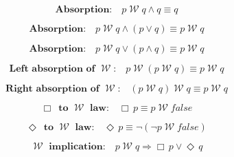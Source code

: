 \documentclass[12pt, fleqn, leqno]{article}
\newcommand{\impl}{\ensuremath{\Rightarrow}}        %
\newcommand{\Wait}{\;\mathcal{W}\;}
\newcommand{\Event}{\Diamond\,}
\newcommand{\Always}{\Box\,}
\newcommand{\spacer}{\vspace{-30pt}}
\begin{document}
\spacer

\begin{equation}\label{E:waitAndQ}
\textbf{Absorption:}\quad p\Wait q\land q\equiv q
\end{equation}

\spacer

\begin{equation}\label{E:waitAndOr}
\textbf{Absorption:}\quad p\Wait q\land (p\lor q) \equiv p\Wait q
\end{equation}

\spacer

\begin{equation}\label{E:waitOrAnd}
\textbf{Absorption:}\quad p\Wait q\lor (p\land q) \equiv p\Wait q
\end{equation}

\spacer

\begin{equation}\label{E:waitAbsL}
\textbf{Left absorption of $\Wait$:}\quad p \Wait (p \Wait q) \equiv p \Wait q
\end{equation}

\spacer

\begin{equation}\label{E:waitAbsR}
\textbf{Right absorption of $\Wait$:}\quad (p \Wait q) \Wait q \equiv p \Wait q
\end{equation}

\spacer

\begin{equation}\label{E:alwaysAsWait}
\textbf{$\Always$ to $\Wait$ law:}\quad \Always p \equiv p \Wait false
\end{equation}

\spacer

\begin{equation}\label{E:eventAsWait}
\textbf{$\Event$ to $\Wait$ law:}\quad \Event p \equiv \neg(\neg p \Wait false)
\end{equation}

\spacer

\begin{equation}\label{E:waitEntailment}
\textbf{$\Wait$ implication:}\quad p \Wait q \impl \Always p\lor \Event q
\end{equation}
\end{document}
